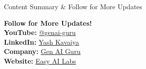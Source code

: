 \documentclass[aspectratio=169]{beamer}
\begin{document}
{\begin{frame}{Content Summary \& Follow for More Updates}
\begin{center}
{\begin{minipage}{0.9\textwidth}
        {\Large\textbf{\textcolor{GoogleBlue}{Follow for More Updates!}}}\\[0.4cm]
        
        {\large\textbf{YouTube:} \href{https://www.youtube.com/@genai-guru}{\textcolor{GoogleRed}{@genai-guru}}}\\[0.3cm]
        
        {\normalsize\textbf{LinkedIn:} \href{https://www.linkedin.com/in/yashkavaiya}{\textcolor{GoogleBlue}{Yash Kavaiya}}}\\[0.2cm]
        
        {\normalsize\textbf{Company:} \href{https://www.linkedin.com/company/genai-guru}{\textcolor{GoogleBlue}{Gen AI Guru}}}\\[0.2cm]
        
        {\normalsize\textbf{Website:} \href{https://easy-ai-labs.lovable.app/}{\textcolor{GoogleBlue}{Easy AI Labs}}}
        
      \end{minipage}
    }
  \end{center}
\end{frame}
}
\end{document}
